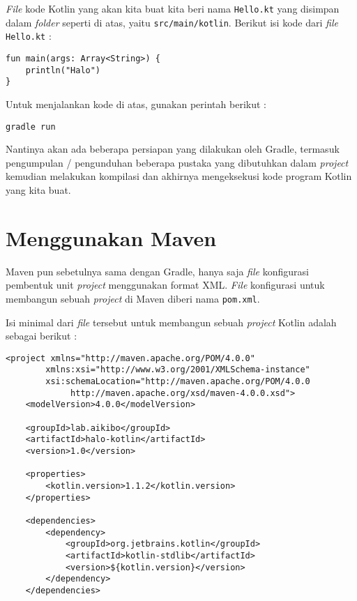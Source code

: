 {\textit{File} kode Kotlin yang akan kita buat kita beri nama \texttt{Hello.kt} yang disimpan dalam \textit{folder} seperti di atas, yaitu \texttt{src/main/kotlin}. Berikut isi kode dari \textit{file} \texttt{Hello.kt} :

\begin{lstlisting}
fun main(args: Array<String>) {
	println("Halo")
}
\end{lstlisting}

Untuk menjalankan kode di atas, gunakan perintah berikut :

\begin{lstlisting}
gradle run
\end{lstlisting}

Nantinya akan ada beberapa persiapan yang dilakukan oleh Gradle, termasuk pengumpulan / pengunduhan beberapa pustaka yang dibutuhkan dalam \textit{project} kemudian melakukan kompilasi dan akhirnya mengeksekusi kode program Kotlin yang kita buat.

\section{Menggunakan Maven}

Maven pun sebetulnya sama dengan Gradle, hanya saja \textit{file} konfigurasi pembentuk unit \textit{project} menggunakan format XML. \textit{File} konfigurasi untuk membangun sebuah \textit{project} di Maven diberi nama \texttt{pom.xml}. 

Isi minimal dari \textit{file} tersebut untuk membangun sebuah \textit{project} Kotlin adalah sebagai berikut :

\begin{lstlisting}
<project xmlns="http://maven.apache.org/POM/4.0.0"
        xmlns:xsi="http://www.w3.org/2001/XMLSchema-instance"
        xsi:schemaLocation="http://maven.apache.org/POM/4.0.0
             http://maven.apache.org/xsd/maven-4.0.0.xsd">
    <modelVersion>4.0.0</modelVersion>

    <groupId>lab.aikibo</groupId>
    <artifactId>halo-kotlin</artifactId>
    <version>1.0</version>
 
    <properties>
        <kotlin.version>1.1.2</kotlin.version>
    </properties>

    <dependencies>
        <dependency>
            <groupId>org.jetbrains.kotlin</groupId>
            <artifactId>kotlin-stdlib</artifactId>
            <version>${kotlin.version}</version>
        </dependency>
    </dependencies>


\end{lstlisting}}
